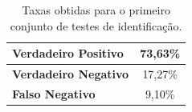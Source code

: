 	\begin{table}[htb]
		\begin{center}
			\caption{Taxas obtidas para o primeiro conjunto de testes de identificação.}
			\label{tab:taxas}
			\begin{tabular}{|l|c|}
				\hline \bf Verdadeiro Positivo & 73,63\% \\
				\hline \bf Verdadeiro Negativo & 17,27\% \\
				\hline \bf Falso Negativo & 9,10\% \\
				\hline
			\end{tabular}
		\end{center}
	\end{table}



				 

